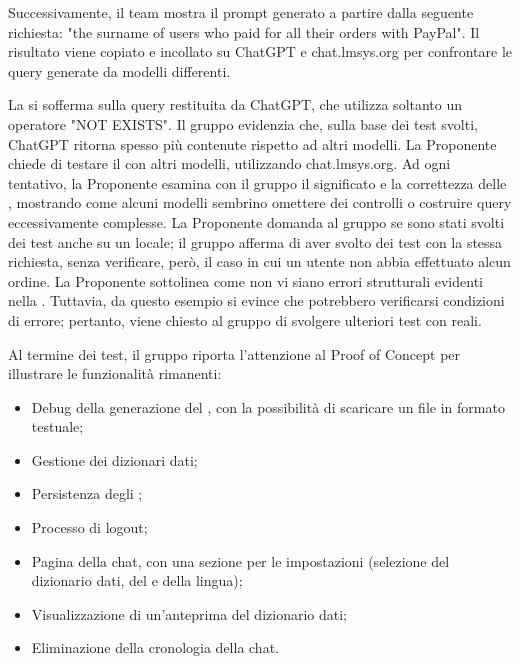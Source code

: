 \vspace{0.5\baselineskip}
\par Successivamente, il team mostra il prompt generato a partire dalla seguente richiesta: "the surname of users who paid for all their orders with PayPal".
Il risultato viene copiato e incollato su ChatGPT e chat.lmsys.org per confrontare le query  generate da modelli differenti.

\par La  si sofferma sulla query restituita da ChatGPT, che utilizza soltanto un operatore "NOT EXISTS". Il gruppo evidenzia che, sulla base dei test svolti, ChatGPT ritorna spesso  più contenute rispetto ad altri modelli.
La Proponente chiede di testare il  con altri modelli, utilizzando chat.lmsys.org. Ad ogni tentativo, la Proponente esamina con il gruppo il significato e la correttezza delle , mostrando come alcuni modelli sembrino omettere dei controlli o costruire query eccessivamente complesse.
La Proponente domanda al gruppo se sono stati svolti dei test anche su un  locale; il gruppo afferma di aver svolto dei test con la stessa richiesta, senza verificare, però, il caso in cui un utente non abbia effettuato alcun ordine.
La Proponente sottolinea come non vi siano errori strutturali evidenti nella . Tuttavia, da questo esempio si evince che potrebbero verificarsi condizioni di errore; pertanto, viene chiesto al gruppo di svolgere ulteriori test con  reali.

\vspace{1.5\baselineskip}
\par Al termine dei test, il gruppo riporta l'attenzione al Proof of Concept per illustrare le funzionalità rimanenti:
\begin{itemize}
	\item Debug della generazione del , con la possibilità di scaricare un file in formato testuale;
	\item Gestione  dei dizionari dati;
	\item Persistenza degli ;
	\item Processo di logout;
	\item Pagina della chat, con una sezione per le impostazioni (selezione del dizionario dati, del  e della lingua);
	\item Visualizzazione di un'anteprima del dizionario dati;
	\item Eliminazione della cronologia della chat.
\end{itemize}

